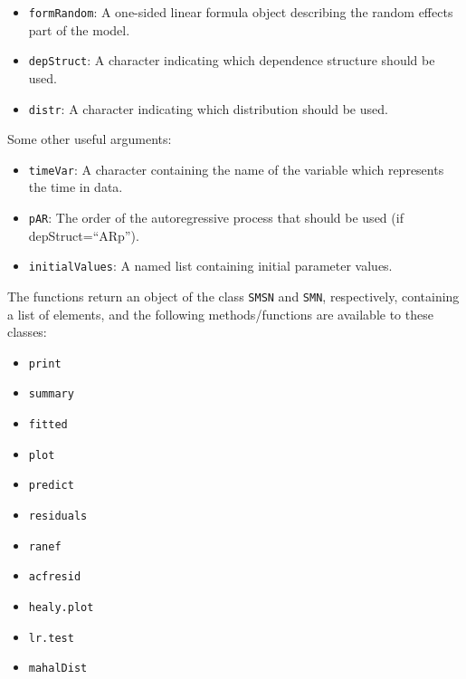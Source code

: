 \documentclass[
  ignorenonframetext,
]{beamer}
\begin{document}
\begin{frame}[fragile]

\begin{itemize}
\item
  \texttt{formRandom}: A one-sided linear formula object describing the
  random effects part of the model.
\item
  \texttt{depStruct}: A character indicating which dependence structure
  should be used.
\item
  \texttt{distr}: A character indicating which distribution should be
  used.\pause
\end{itemize}

Some other useful arguments:

\begin{itemize}
\item
  \texttt{timeVar}: A character containing the name of the variable
  which represents the time in data.
\item
  \texttt{pAR}: The order of the autoregressive process that should be
  used (if depStruct=``ARp'').
\item
  \texttt{initialValues}: A named list containing initial parameter
  values.
\end{itemize}

\end{frame}

\begin{frame}[fragile]

The functions return an object of the class \texttt{SMSN} and
\texttt{SMN}, respectively, containing a list of elements, and the
following methods/functions are available to these classes:

\begin{itemize}
\item
  \texttt{print}
\item
  \texttt{summary}
\item
  \texttt{fitted}
\item
  \texttt{plot}
\item
  \texttt{predict}
\item
  \texttt{residuals}
\item
  \texttt{ranef}
\item
  \texttt{acfresid}
\item
  \texttt{healy.plot}
\item
  \texttt{lr.test}
\item
  \texttt{mahalDist} 
\end{itemize}

\end{frame}
\end{document}
